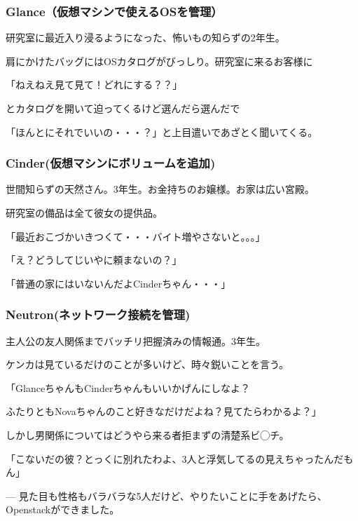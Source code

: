 \documentclass[8pt,b5paper,tombo,openany]{jsbook}
\begin{document}
\subsubsection{Glance（仮想マシンで使えるOSを管理）}

研究室に最近入り浸るようになった、怖いもの知らずの2年生。

肩にかけたバッグにはOSカタログがびっしり。研究室に来るお客様に

「ねえねえ見て見て！どれにする？？」

とカタログを開いて迫ってくるけど選んだら選んだで

「ほんとにそれでいいの・・・？」と上目遣いであざとく聞いてくる。

\subsubsection{Cinder(仮想マシンにボリュームを追加)}

世間知らずの天然さん。3年生。お金持ちのお嬢様。お家は広い宮殿。

研究室の備品は全て彼女の提供品。

「最近おこづかいきつくて・・・バイト増やさないと。。。」

「え？どうしてじいやに頼まないの？」

「普通の家にはいないんだよCinderちゃん・・・」

\subsubsection{Neutron(ネットワーク接続を管理)}

主人公の友人関係までバッチリ把握済みの情報通。3年生。

ケンカは見ているだけのことが多いけど、時々鋭いことを言う。

「GlanceちゃんもCinderちゃんもいいかげんにしなよ？

ふたりともNovaちゃんのこと好きなだけだよね？見てたらわかるよ？」

しかし男関係についてはどうやら来る者拒まずの清楚系ビ◯チ。

「こないだの彼？とっくに別れたわよ、3人と浮気してるの見えちゃったんだもん」


--- 見た目も性格もバラバラな5人だけど、やりたいことに手をあげたら、Openstackができました。

\newpage

\thispagestyle{empty}
\end{document}
